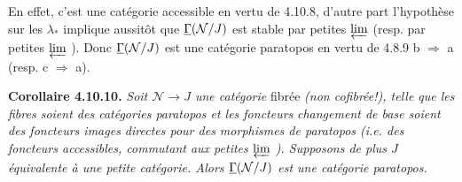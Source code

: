 En effet, c'est une catégorie accessible en vertu de 4.10.8, d'autre part l'hypothèse sur les $\lambda_*$ implique aussitôt que $\underline{\Gamma}(\mathcal{N}/J)$ est stable par petites $\varprojlim$ (resp. par petites $\varprojlim$
). Donc $\underline{\Gamma}(\mathcal{N}/J)$ est une catégorie paratopos en vertu de 4.8.9 b $\Longrightarrow$ a (resp. c $\Longrightarrow$ a).

\textbf{Corollaire 4.10.10.} \textit{Soit $\mathcal{N} \longrightarrow J$ une catégorie} fibrée \textit{(non cofibrée!), telle que les fibres soient des catégories paratopos et les foncteurs}  \textit{changement de base soient des foncteurs images directes pour des morphismes de paratopos (i.e. des foncteurs accessibles, commutant aux petites $\varprojlim$ ). Supposons de plus $J$ équivalente à une petite catégorie. Alors $\underline{\Gamma}(\mathcal{N}/J)$ est une catégorie paratopos.}

